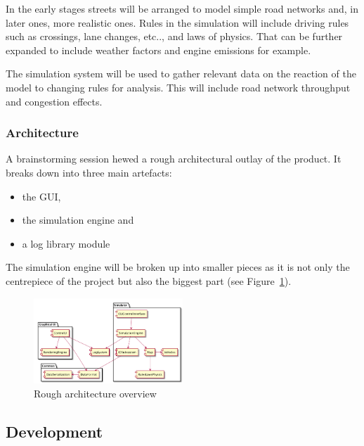 \vspace{2mm}

In the early stages streets will be arranged to model simple road networks and, in later ones, more realistic ones.
Rules in the simulation will include driving rules such as crossings, lane changes, etc.., and laws of physics. That can be further expanded to include weather factors and engine emissions for example.

\vspace{2mm}

The simulation system will be used to gather relevant data on the reaction of the model to changing rules for analysis. This will include road network throughput and congestion effects.

\subsubsection{Architecture}

A brainstorming session hewed a rough architectural outlay of the product. It breaks down into three main artefacts:
\vspace{1mm}
\begin{itemize}
	\item the GUI,
	\item the simulation engine and
	\item a log library module
\end{itemize}
\vspace{1mm}
The simulation engine will be broken up into smaller pieces as it is not only the centrepiece of the project but also the biggest part (see Figure~\ref{fig:arch_overview}).

\begin{figure}[h!]
	\vspace{1.5em}
  	\caption{Rough architecture overview}
  	\label{fig:arch_overview}
  	\centering
	\includegraphics[width=0.5\textwidth]{figs/arch_diagram.png}
  	\vspace{1.5em}
\end{figure}

\subsection{Development}


